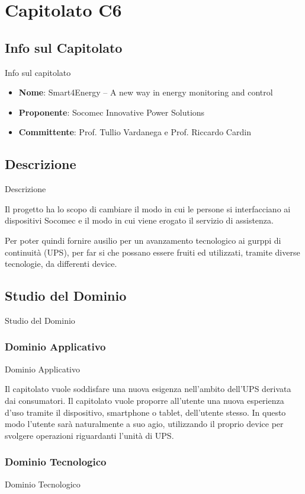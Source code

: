 \documentclass[11pt]{article}
\begin{document}
\newpage

\section{Capitolato C6}
    \subsection{Info sul Capitolato} Info sul capitolato
    \begin{itemize}
        \item \textbf{Nome}: Smart4Energy – A new way in energy monitoring and control
        \item \textbf{Proponente}: Socomec Innovative Power Solutions
        \item \textbf{Committente}: Prof. Tullio Vardanega e Prof. Riccardo Cardin
    \end{itemize}
    \subsection{Descrizione} Descrizione
    
    Il progetto ha lo scopo di cambiare il modo in cui le persone si interfacciano ai dispositivi Socomec e il modo in
    cui viene erogato il servizio di assistenza.
    
    Per poter quindi fornire ausilio per un avanzamento tecnologico ai gurppi di continuità (UPS), per far si che possano essere fruiti ed utilizzati, tramite diverse tecnologie, da differenti device.
    
    
    \subsection{Studio del Dominio} Studio del Dominio
        \subsubsection{Dominio Applicativo} Dominio Applicativo
        
        Il capitolato vuole soddisfare una nuova esigenza nell'ambito dell'UPS derivata dai consumatori.
        Il capitolato vuole proporre all’utente una nuova esperienza d’uso tramite il dispositivo, smartphone o
        tablet, dell’utente stesso.
        In questo modo l’utente sarà naturalmente a suo agio, utilizzando il proprio device per svolgere operazioni riguardanti l'unità di UPS.
        \subsubsection{Dominio Tecnologico} Dominio Tecnologico
        
\end{document}
